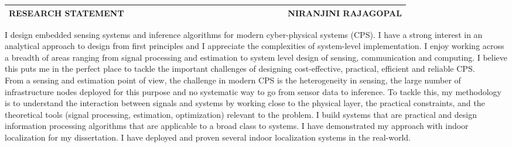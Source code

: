 \documentclass[11pt]{article}
\date{}
\begin{document}

\begin{table}
\color{blue}
\begin{tabular*}{\textwidth}{l r}
\large\textbf{RESEARCH STATEMENT} & 
\hfill \ \ \ \ \ \ \ \ \ \ \ \ \ \ \ \ \ \ \ \
\ \ \ \ \ \ \ \ \ \ \ \ \ 
\large\textbf{NIRANJINI RAJAGOPAL}\\
\hline
\end{tabular*}

\end{table}
 
I design embedded sensing systems and inference algorithms for modern cyber-physical systems (CPS).  
I have a strong interest in an analytical approach to design from first principles and I appreciate the complexities of system-level implementation. 
I enjoy working across a breadth of areas ranging from signal processing and estimation to system level design of sensing, communication and computing. %
I believe this puts me in the perfect place to tackle the important challenges of designing cost-effective, practical, efficient and reliable CPS. \\%

From a sensing and estimation point of view, the challenge in modern CPS is the heterogeneity in sensing, the large number of infrastructure nodes deployed for this purpose and no systematic way to go from sensor data to inference. To tackle this, 
my methodology is to understand the interaction between signals and systems by working close to the physical layer, the practical constraints, and the theoretical tools (signal processing, estimation, optimization) relevant to the problem. I build systems that are practical and design information processing algorithms that are applicable to a broad class to systems. I have demonstrated my approach with indoor localization for my dissertation. I have deployed and proven several indoor localization systems in the real-world.
\end{document}
